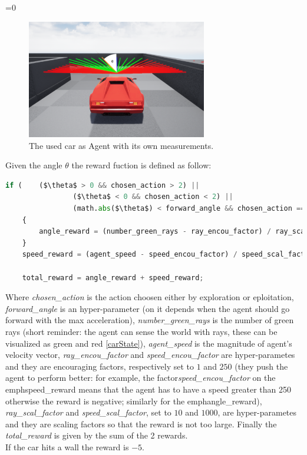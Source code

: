 \documentclass[14pt]{extarticle}
\newcounter{debug}
\begin{document}
\begin{flushleft}
\ifnum\value{debug}=0 {
\begin{figure}[H] \label{carAngle}
    		\centering\includegraphics[width=0.7\textwidth]{./Image/RF/carAngle.png}
		\vspace{5mm}
    		\caption{The used car as Agent with its own measurements.}
	\end{figure}
} \fi
	Given the angle $\theta$ the reward fuction is defined as follow:
\begin{lstlisting}[mathescape=true, language=Python]
	if (	($\theta$ > 0 && chosen_action > 2) ||
				($\theta$ < 0 && chosen_action < 2) ||
				(math.abs($\theta$) < forward_angle && chosen_action == 2))
	{
		angle_reward = (number_green_rays - ray_encou_factor) / ray_scal_factor;
	}
	speed_reward = (agent_speed - speed_encou_factor) / speed_scal_factor;
	
	total_reward = angle_reward + speed_reward;
\end{lstlisting}
	Where \emph{chosen\_action} is the action choosen either by exploration or eploitation, \emph{forward\_angle} is an hyper-parameter (on it depends when the agent should go forward with the max acceleration), \emph{number\_green\_rays} is the number of green rays (short reminder: the agent can sense the world with rays, these can be visualized as green and red \ref{carState}), \emph{agent\_speed} is the magnitude of agent's velocity vector, \emph{ray\_encou\_factor} and \emph{speed\_encou\_factor} are hyper-parametes and they are encouraging factors, respectively set to $1$ and $250$ (they push the agent to perform better: for example, the factor\emph{speed\_encou\_factor} on the emph{speed\_reward} means that the agent has to have a speed greater than 250 otherwise the reward is negative; similarly for the emph{angle\_reward}), \emph{ray\_scal\_factor} and \emph{speed\_scal\_factor}, set to $10$ and $1000$, are hyper-parametes and they are scaling factors so that the reward is not too large. Finally the \emph{total\_reward} is given by the sum of the 2 rewards.
	\\
	If the car hits a wall the reward is $-5$.
	

\end{flushleft}
\end{document}
